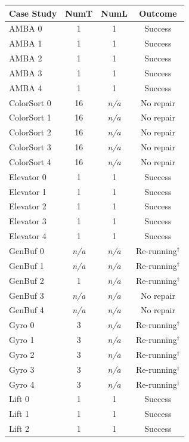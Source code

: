 \begin{table}[h]
\centering
\scriptsize
\setlength{\tabcolsep}{3pt}
\begin{tabular}{@{}lcc c@{}}
\toprule
Case Study & NumT & NumL & Outcome \\
\midrule
AMBA 0 & 1 & 1 & Success \\
AMBA 1 & 1 & 1 & Success \\
AMBA 2 & 1 & 1 & Success \\
AMBA 3 & 1 & 1 & Success \\
AMBA 4 & 1 & 1 & Success \\
\midrule
ColorSort 0 & 16 & \textit{n/a} & No repair \\
ColorSort 1 & 16 & \textit{n/a} & No repair \\
ColorSort 2 & 16 & \textit{n/a} & No repair \\
ColorSort 3 & 16 & \textit{n/a} & No repair \\
ColorSort 4 & 16 & \textit{n/a} & No repair \\
\midrule
Elevator 0 & 1 & 1 & Success \\
Elevator 1 & 1 & 1 & Success \\
Elevator 2 & 1 & 1 & Success \\
Elevator 3 & 1 & 1 & Success \\
Elevator 4 & 1 & 1 & Success \\
\midrule
GenBuf 0 & \textit{n/a} & \textit{n/a} & Re-running$^\dagger$ \\
GenBuf 1 & \textit{n/a} & \textit{n/a} & Re-running$^\dagger$ \\
GenBuf 2 & 1 & \textit{n/a} & Re-running$^\dagger$ \\
GenBuf 3 & \textit{n/a} & \textit{n/a} & No repair \\
GenBuf 4 & \textit{n/a} & \textit{n/a} & No repair \\
\midrule
Gyro 0 & 3 & \textit{n/a} & Re-running$^\dagger$ \\
Gyro 1 & 3 & \textit{n/a} & Re-running$^\dagger$ \\
Gyro 2 & 3 & \textit{n/a} & Re-running$^\dagger$ \\
Gyro 3 & 3 & \textit{n/a} & Re-running$^\dagger$ \\
Gyro 4 & 3 & \textit{n/a} & Re-running$^\dagger$ \\
\midrule
Lift 0 & 1 & 1 & Success \\
Lift 1 & 1 & 1 & Success \\
Lift 2 & 1 & 1 & Success \\

\end{tabular}
\end{table}
